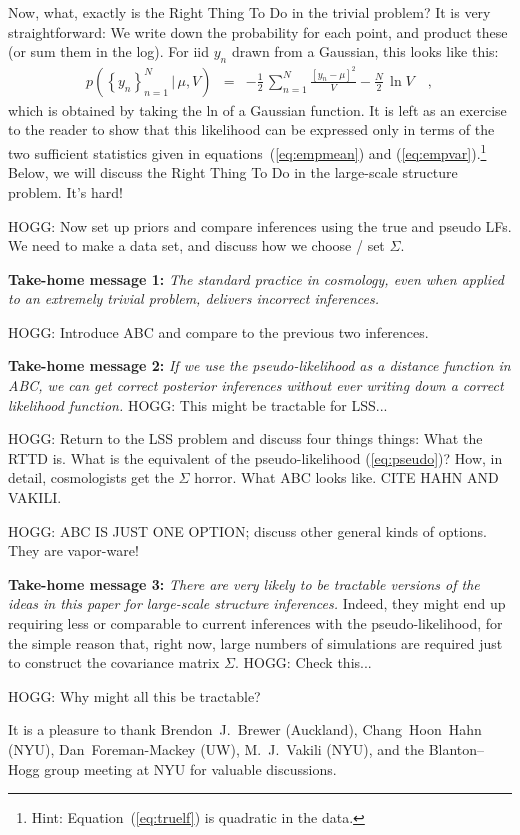\documentclass[12pt, letterpaper, preprint]{aastex}
\newcommand{\setof}[1]{\left\{{#1}\right\}}
\newcommand{\given}{\,|\,}
\begin{document}
Now, what, exactly is the Right Thing To Do in the trivial problem?
It is very straightforward:
We write down the probability for each point, and product these
(or sum them in the log).
For iid $y_n$ drawn from a Gaussian, this looks like this:
\begin{eqnarray}
p(\setof{y_n}_{n=1}^N\given \mu,V) &=& -\frac{1}{2}\,\sum_{n=1}^N \frac{[y_n - \mu]^2}{V} - \frac{N}{2}\,\ln V
\label{eq:truelf}\quad ,
\end{eqnarray}
which is obtained by taking the ln of a Gaussian function.
It is left as an exercise to the reader to show that this likelihood
can be expressed only in terms of the two sufficient statistics given
in equations~(\ref{eq:empmean}) and (\ref{eq:empvar}).\footnote{Hint:
  Equation~(\ref{eq:truelf}) is quadratic in the data.}
Below, we will discuss the Right Thing To Do in the large-scale
structure problem. It's hard!

HOGG: Now set up priors and compare inferences using the true and pseudo LFs.
We need to make a data set, and discuss how we choose / set $\Sigma$.

\textbf{Take-home message 1:} \emph{The standard practice in
  cosmology, even when applied to an extremely trivial problem,
  delivers incorrect inferences.}

HOGG: Introduce ABC and compare to the previous two inferences.

\textbf{Take-home message 2:} \emph{If we use the pseudo-likelihood as
  a distance function in ABC, we can get correct posterior inferences
  without ever writing down a correct likelihood function.}
HOGG: This might be tractable for LSS...

HOGG: Return to the LSS problem and discuss four things things: What
the RTTD is. What is the equivalent of the pseudo-likelihood
(\ref{eq:pseudo})? How, in detail, cosmologists get the $\Sigma$
horror. What ABC looks like. CITE HAHN AND VAKILI.

HOGG: ABC IS JUST ONE OPTION; discuss other general kinds of options.
They are vapor-ware!

\textbf{Take-home message 3:} \emph{There are very likely to be
  tractable versions of the ideas in this paper for large-scale
  structure inferences.}
Indeed, they might end up requiring less or comparable to current
inferences with the pseudo-likelihood, for the simple reason that,
right now, large numbers of simulations are required just to construct
the covariance matrix $\Sigma$.
HOGG: Check this...

HOGG: Why might all this be tractable?

\acknowledgements
It is a pleasure to thank
  Brendon~J.~Brewer (Auckland),
  Chang~Hoon~Hahn (NYU),
  Dan~Foreman-Mackey (UW),
  M.~J.~Vakili (NYU),
  and the Blanton--Hogg group meeting at NYU
for valuable discussions.
\end{document}
